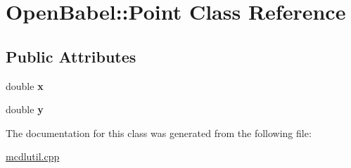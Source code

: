 \hypertarget{class_open_babel_1_1_point}{\section{Open\-Babel\-:\-:Point Class Reference}
\label{class_open_babel_1_1_point}
}
\subsection*{Public Attributes}
\begin{DoxyCompactItemize}
\item 
\hypertarget{class_open_babel_1_1_point_a93334a1ff80c53e4e7ad7497d3bd27df}{double {\bfseries x}}\label{class_open_babel_1_1_point_a93334a1ff80c53e4e7ad7497d3bd27df}

\item 
\hypertarget{class_open_babel_1_1_point_afcd72257cc627c0f7b6634d978f525c2}{double {\bfseries y}}\label{class_open_babel_1_1_point_afcd72257cc627c0f7b6634d978f525c2}

\end{DoxyCompactItemize}


The documentation for this class was generated from the following file\-:\begin{DoxyCompactItemize}
\item 
\hyperlink{mcdlutil_8cpp}{mcdlutil.\-cpp}\end{DoxyCompactItemize}
